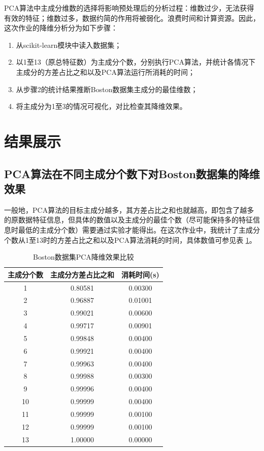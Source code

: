 \documentclass[12pt,a4paper]{article}
\theoremstyle{definition}
\begin{document}
PCA算法中主成分维数的选择将影响预处理后的分析过程：维数过少，无法获得有效的特征；维数过多，数据约简的作用将被弱化。浪费时间和计算资源。因此，这次作业的降维分析分为如下步骤：

\begin{enumerate}
	\item 从scikit-learn模块中读入数据集；
	
	\item 以1至13（原总特征数）为主成分个数，分别执行PCA算法，并统计各情况下主成分的方差占比之和以及PCA算法运行所消耗的时间；
	
	\item 从步骤2的统计结果推断Boston数据集主成分的最佳维数；
	
	\item 将主成分为1至3的情况可视化，对比检查其降维效果。
\end{enumerate}

\section{结果展示}

\subsection{PCA算法在不同主成分个数下对Boston数据集的降维效果}
\label{sec:pca_res_com}

一般地，PCA算法的目标主成分越多，其方差占比之和也就越高，即包含了越多的原数据特征信息，但具体的数值以及主成分的最佳个数（尽可能保持多的特征信息时最低的主成分个数）需要通过实验才能得出。在这次作业中，我统计了主成分个数从1至13时的方差占比之和以及PCA算法消耗的时间，具体数值可参见表 \ref{tab:pca_res_com}。

\begin{table}[H]
	\renewcommand\arraystretch{1.35}
	\caption{Boston数据集PCA降维效果比较}
	\label{tab:pca_res_com}
	\centering
	
	\begin{tabular}{c|c|c}
		\centering
		主成分个数 &   主成分方差占比之和 & 消耗时间(s) \\
		\hline
		1 & 0.80581 & 0.00300 \\
		2 & 0.96887 & 0.01001 \\
		3 & 0.99021 & 0.00600 \\
		4 & 0.99717 & 0.00901 \\
		5 & 0.99848 & 0.00400 \\
		6 & 0.99921 & 0.00400 \\
		7 & 0.99963 & 0.00400 \\
		8 & 0.99988 & 0.00300 \\
		9 & 0.99996 & 0.00400 \\
		10 & 0.99999 & 0.00400 \\
		11 & 0.99999 & 0.00100 \\
		12 & 0.99999 & 0.00100 \\
		13 & 1.00000 & 0.00000 \\
	\end{tabular}
\end{table}
\end{document}
